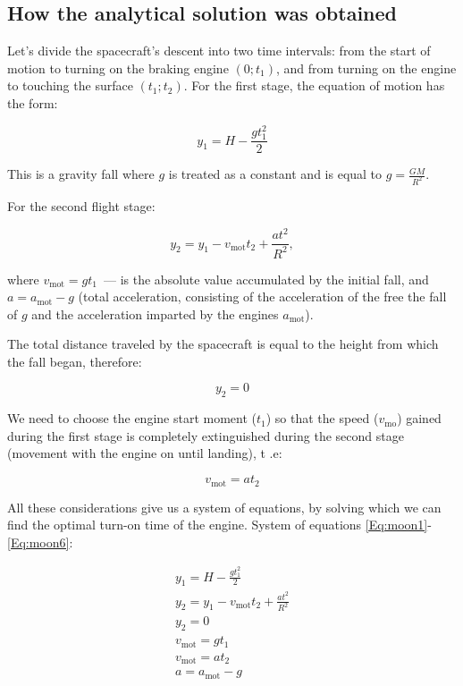 \documentclass[12pt,a4paper]{article}
\begin{document}
\hfill

\noindent{}

\subsection{How the analytical solution was obtained}
\label{Sec:Moon-Model}

Let's divide the spacecraft's descent into two time intervals: from the start of motion to turning on the braking engine $(0; t_1)$, and from turning on the engine to touching the surface $(t_1; t_2)$. For the first stage, the equation of motion has the form:

$$
y_1 = H - \frac{g t^2_1}{2}
$$

This is a gravity fall where $g$ is treated as a constant and is equal to $g
= \frac{G M}{R^2}$.

For the second flight stage:

$$
y_2 = y_1 - v_{\text{mot}} t_2 + \frac{a t^2}{R^2},
$$

where $ v_{\text{mot}} = g t_1$~--- is the absolute value accumulated by the initial fall, and $a = a_{\text{mot}} - g$ (total acceleration, consisting of the acceleration of the free the fall of $g$ and the acceleration imparted by the engines $a_{\text{mot}}$).

The total distance traveled by the spacecraft is equal to the height from which the fall began, therefore:

$$
y_2 = 0
$$

We need to choose the engine start moment ($t_1$) so that the speed ($v_{\text{mo}}$) gained during the first stage is completely extinguished during the second stage (movement with the engine on until landing), t .e:

$$
v_{\text{mot}} = a t_2
$$

All these considerations give us a system of equations, by solving which we can find the optimal turn-on time of the engine. System of equations \ref{Eq:moon1}-\ref{Eq:moon6}:

\begin{eqnarray}
  y_1 = H - \frac{g t^2_1}{2} \label{Eq:moon1} \\
  y_2 = y_1 - v_{\text{mot}} t_2 + \frac{a t^2}{R^2} \label{Eq:moon2}\\
  y_2 = 0 \label{Eq:moon3} \\
  v_{\text{mot}} = g t_1 \label{Eq:moon4} \\
  v_{\text{mot}} = a t_2 \label{Eq:moon5} \\
  a = a_{\text{mot}} - g \label{Eq:moon6}
\end{eqnarray}
\end{document}
